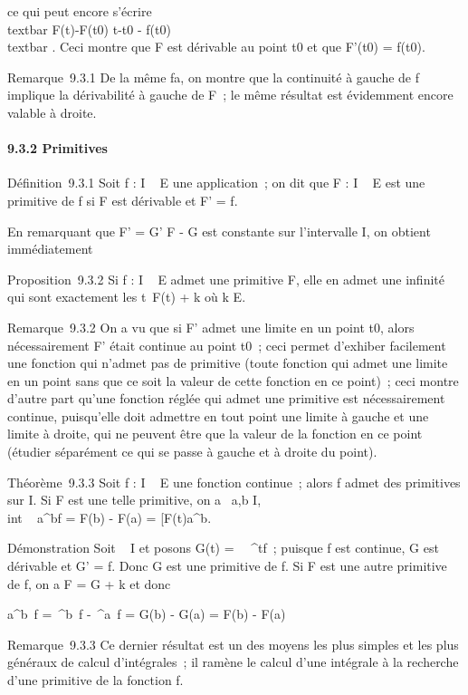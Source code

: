 ce qui peut encore s'écrire \\textbar{}
F(t)-F(t0) \over t-t0 -
f(t0)\\textbar{} \leq \epsilon. Ceci montre que F est
dérivable au point t0 et que F'(t0) =
f(t0).

Remarque~9.3.1 De la même fa\ccon, on montre que la
continuité à gauche de f implique la dérivabilité à gauche de F~; le
même résultat est évidemment encore valable à droite.

\paragraph{9.3.2 Primitives}

Définition~9.3.1 Soit f : I \rightarrow~ E une application~; on dit que F : I \rightarrow~ E
est une primitive de f si F est dérivable et F' = f.

En remarquant que F' = G' \Leftrightarrow F - G est
constante sur l'intervalle I, on obtient immédiatement

Proposition~9.3.2 Si f : I \rightarrow~ E admet une primitive F, elle en admet une
infinité qui sont exactement les t\mapsto~F(t) + k
où k \in E.

Remarque~9.3.2 On a vu que si F' admet une limite en un point
t0, alors nécessairement F' était continue au point
t0~; ceci permet d'exhiber facilement une fonction qui n'admet
pas de primitive (toute fonction qui admet une limite en un point sans
que ce soit la valeur de cette fonction en ce point)~; ceci montre
d'autre part qu'une fonction réglée qui admet une primitive est
nécessairement continue, puisqu'elle doit admettre en tout point une
limite à gauche et une limite à droite, qui ne peuvent être que la
valeur de la fonction en ce point (étudier séparément ce qui se passe à
gauche et à droite du point).

Théorème~9.3.3 Soit f : I \rightarrow~ E une fonction continue~; alors f admet des
primitives sur I. Si F est une telle primitive, on a
\forall~a,b \in I, \\int ~
a^bf = F(b) - F(a) = \left
{[}F(t)\right {]}a^b.

Démonstration Soit \alpha~ \in I et posons G(t) =\int ~
\alpha~^tf~; puisque f est continue, G est dérivable et G' = f.
Donc G est une primitive de f. Si F est une autre primitive de f, on a F
= G + k et donc

\int  a^b~f
=\int  \alpha~^b~f
-\int  \alpha~^a~f = G(b) - G(a) = F(b)
- F(a)

Remarque~9.3.3 Ce dernier résultat est un des moyens les plus simples et
les plus généraux de calcul d'intégrales~; il ramène le calcul d'une
intégrale à la recherche d'une primitive de la fonction f.

